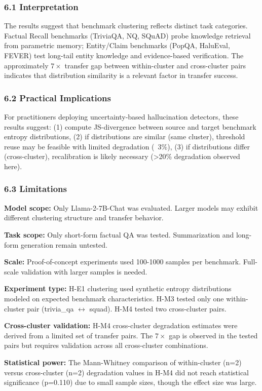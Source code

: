 
\subsubsection{6.1 Interpretation}

The results suggest that benchmark clustering reflects distinct task categories. Factual Recall benchmarks (TriviaQA, NQ, SQuAD) probe knowledge retrieval from parametric memory; Entity/Claim benchmarks (PopQA, HaluEval, FEVER) test long-tail entity knowledge and evidence-based verification. The approximately $7\times$ transfer gap between within-cluster and cross-cluster pairs indicates that distribution similarity is a relevant factor in transfer success.

\subsubsection{6.2 Practical Implications}

For practitioners deploying uncertainty-based hallucination detectors, these results suggest: (1) compute JS-divergence between source and target benchmark entropy distributions, (2) if distributions are similar (same cluster), threshold reuse may be feasible with limited degradation (~3\%), (3) if distributions differ (cross-cluster), recalibration is likely necessary (>20\% degradation observed here).

\subsubsection{6.3 Limitations}

\textbf{Model scope:} Only Llama-2-7B-Chat was evaluated. Larger models may exhibit different clustering structure and transfer behavior.

\textbf{Task scope:} Only short-form factual QA was tested. Summarization and long-form generation remain untested.

\textbf{Scale:} Proof-of-concept experiments used 100-1000 samples per benchmark. Full-scale validation with larger samples is needed.

\textbf{Experiment type:} H-E1 clustering used synthetic entropy distributions modeled on expected benchmark characteristics. H-M3 tested only one within-cluster pair (trivia\_qa $\leftrightarrow$ squad). H-M4 tested two cross-cluster pairs.

\textbf{Cross-cluster validation:} H-M4 cross-cluster degradation estimates were derived from a limited set of transfer pairs. The $7\times$ gap is observed in the tested pairs but requires validation across all cross-cluster combinations.

\textbf{Statistical power:} The Mann-Whitney comparison of within-cluster (n=2) versus cross-cluster (n=2) degradation values in H-M4 did not reach statistical significance (p=0.110) due to small sample sizes, though the effect size was large.

